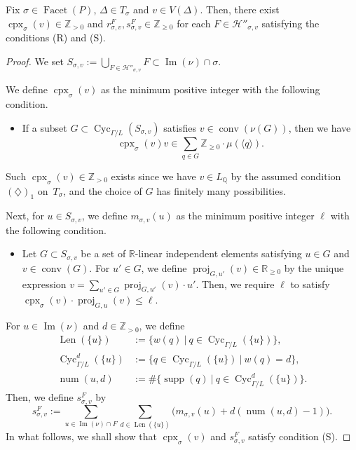 \begin{lem}\label{lem:r}
Fix $\sigma \in \operatorname{Facet}(P)$, $\Delta \in T_{\sigma}$ and $v \in V(\Delta)$. 
Then, there exist $\operatorname{cpx}_{\sigma}(v) \in \mathbb{Z}_{> 0}$ and  
$r^{F} _{\sigma, v}, s^{F} _{\sigma, v} \in \mathbb{Z}_{\ge 0}$ for each $F \in \mathcal{H}'' _{\sigma, v}$ satisfying the conditions (R) and (S). 
\end{lem}
\begin{proof}
We set $S_{\sigma, v} := \bigcup _{F \in \mathcal{H}'' _{\sigma, v}} F \subset \operatorname{Im}(\nu) \cap \sigma$. 

We define $\operatorname{cpx}_{\sigma}(v)$ as the minimum positive integer with the following condition. 
\begin{itemize}
\item 
If a subset $G \subset \operatorname{Cyc}_{\Gamma /L}(S_{\sigma, v})$ satisfies $v \in \operatorname{conv}( \nu(G) )$, 
then we have 
\[
\operatorname{cpx}_{\sigma}(v) v \in \sum _{q \in G} \mathbb{Z}_{\ge 0} \cdot \mu ( \langle q \rangle ). 
\]
\end{itemize}
\noindent
Such $\operatorname{cpx}_{\sigma}(v) \in \mathbb{Z}_{>0}$ exists 
since we have $v \in L_{\mathbb{Q}}$ by the assumed condition $(\diamondsuit)_1$ on~$T_{\sigma}$, 
and the choice of $G$ has finitely many possibilities. 

Next, for $u \in S_{\sigma, v}$, 
we define $m_{\sigma, v}(u)$ as the minimum positive integer $\ell$ with the following condition. 
\begin{itemize}
\item
Let $G \subset S_{\sigma, v}$ be 
a set of $\mathbb{R}$-linear independent elements satisfying $u \in G$ and $v \in \operatorname{conv}(G)$. 
For $u' \in G$, we define $\operatorname{proj}_{G,u'}(v) \in \mathbb{R}_{\ge 0}$ by the unique expression 
$v = \sum _{u' \in G} \operatorname{proj}_{G,u'}(v) \cdot u'$. 
Then, we require $\ell$ to satisfy \mbox{$\operatorname{cpx}_{\sigma}(v) \cdot \operatorname{proj}_{G,u}(v) \le \ell$}. 
\end{itemize}

For $u \in \operatorname{Im}(\nu)$ and $d \in \mathbb{Z}_{>0}$, we define 
\begin{align*}
\operatorname{Len} (\{ u \}) 
&:= \bigl \{ w(q) \ \big| \ q \in \operatorname{Cyc}_{\Gamma /L} (\{ u \}) \bigr \}, \\
\operatorname{Cyc}_{\Gamma /L} ^d (\{ u \}) 
&:= \bigl \{ q \in \operatorname{Cyc}_{\Gamma /L} (\{ u \}) \ \big| \ w(q) = d \bigr \}, \\
\operatorname{num}(u,d) 
&:= \# \bigl\{ \operatorname{supp}(q) \ \big| \  q \in \operatorname{Cyc}_{\Gamma /L}^d (\{ u \}) \bigr \}. 
\end{align*}
Then, we define $s^{F} _{\sigma, v}$ by 
\[
s^{F} _{\sigma, v} := 
\sum_{u \in \operatorname{Im}(\nu) \cap F} 
\sum_{d \in \operatorname{Len} (\{ u \})}
\bigl( m_{\sigma, v}(u) + d (\operatorname{num}(u,d) - 1) \bigr).
\]
In what follows, we shall show that $\operatorname{cpx}_{\sigma}(v)$ and $s^{F} _{\sigma, v}$ satisfy condition (S). 


\end{proof}
